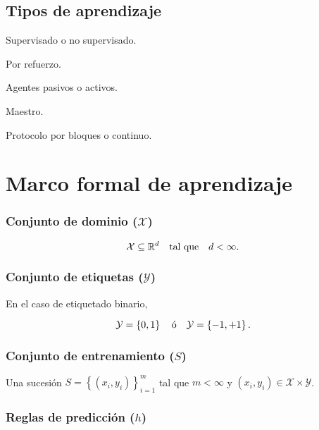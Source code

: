 \documentclass[8pt,a4paper]{extarticle}
\begin{document}
\begin{multicols}{3}
\subsection*{Tipos de aprendizaje}

\begin{bulletlist}
\item Supervisado o no supervisado.
\item Por refuerzo.
\item Agentes pasivos o activos.
\item Maestro.
\item Protocolo por bloques o continuo.
\end{bulletlist}

\newpage

\section{Marco formal de aprendizaje}

\subsubsection*{Conjunto de dominio ($\mathcal{X}$)}

$$\mathcal{X} \subseteq \mathbb{R}^d\quad \text{\normalfont tal que} \quad d < \infty.$$

\subsubsection*{Conjunto de etiquetas ($\mathcal{Y}$)}

En el caso de etiquetado binario, \par $$\mathcal{Y} = \left\{ 0,1 \right\}\quad \text{\normalfont ó}\quad \mathcal{Y} = \left\{ -1,+1 \right\} .$$

\subsubsection*{Conjunto de entrenamiento ($S$)}

Una sucesión $\displaystyle S = \left\{ \left( x_i, y_i \right)  \right\}_{i = 1}^m $ tal que $m < \infty$ y $\left( x_i, y_i \right) \in \mathcal{X} \times \mathcal{Y}$.

\subsubsection*{Reglas de predicción ($h$)}


\end{multicols}
\end{document}
